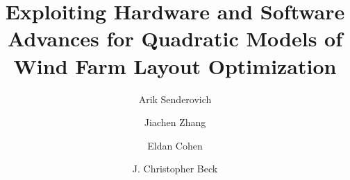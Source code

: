 \documentclass[preprint,12pt]{elsarticle}
\newcommand{\mytitle}{Exploiting Hardware and Software Advances 
 for Quadratic Models of Wind Farm Layout Optimization}
\begin{document}
	

\title{\mytitle}



\author[add1]{Arik Senderovich}










\author[add2]{Jiachen Zhang}

\author[add2]{Eldan Cohen}

\author[add2]{J. Christopher Beck}


\address[add1]{Rotman School of Management, University of Toronto, 105 St. George St., Toronto, Canada}
\address[add2]{Department of Mechanical and Industrial Engineering, University of Toronto, 40 St. George St., Toronto, Canada}
\end{document}
